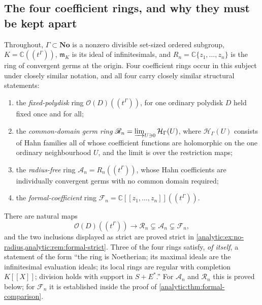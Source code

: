 \documentclass[11pt,letterpaper]{article}
\theoremstyle{definition}
\theoremstyle{remark}
\newcommand{\C}{\mathbb C}
\newcommand{\No}{\mathbf{No}}
\newcommand{\A}{\mathscr A}
\newcommand{\RR}{\mathscr R}
\newcommand{\FF}{\mathscr F}
\newcommand{\HH}{\mathcal H}
\newcommand{\m}{\mathfrak m}
\newcommand{\OO}{\mathcal O}
\numberwithin{equation}{section}
\begin{document}
\subsection{The four coefficient rings, and why they must be kept
apart}\label{analytic:subsec:four-rings}
Throughout, $\Gamma\subset\No$ is a nonzero divisible set-sized ordered
subgroup, $K=\C((t^\Gamma))$, $\m_K$ is its ideal of infinitesimals, and
$R_n=\C\{z_1,\ldots,z_n\}$ is the ring of convergent germs at the origin.
Four coefficient rings occur in this subject under closely similar
notation, and all four carry closely similar structural statements:
\begin{enumerate}
\item the \emph{fixed-polydisk} ring $\OO(D)((t^\Gamma))$, for one ordinary
polydisk $D$ held fixed once and for all;
\item the \emph{common-domain germ ring}
$\RR_n=\varinjlim_{U\ni0}\HH_\Gamma(U)$, where $\HH_\Gamma(U)$ consists of
Hahn families all of whose coefficient functions are holomorphic on the one
ordinary neighbourhood $U$, and the limit is over the restriction maps;
\item the \emph{radius-free} ring $\A_n=R_n((t^\Gamma))$, whose Hahn
coefficients are individually convergent germs with no common domain
required;
\item the \emph{formal-coefficient} ring $\FF_n=\C[[z_1,\ldots,z_n]]((t^\Gamma))$.
\end{enumerate}
There are natural maps
\begin{equation}\label{analytic:eq:ring-chain}
 \OO(D)((t^\Gamma))\longrightarrow\RR_n
 \subsetneq\A_n\subsetneq\FF_n ,
\end{equation}
and the two inclusions displayed as strict are proved strict in
\cref{analytic:ex:no-radius,analytic:rem:formal-strict}. Three of the four rings satisfy, \emph{of itself}, a statement of the form
``the ring is Noetherian; its maximal ideals are the infinitesimal evaluation
ideals; its local rings are regular with completion $K[[X]]$; division holds
with support in $S+E^*$.''  For $\A_n$ and $\RR_n$ this is proved below; for
$\FF_n$ it is established inside the proof of
\cref{analytic:thm:formal-comparison}.
\end{document}

